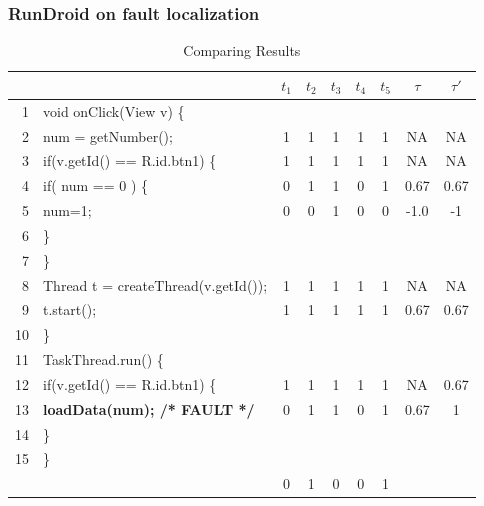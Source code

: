 \documentclass{beamer}
\begin{document}
\begin{frame}
\frametitle{RunDroid on fault localization}
\begin{table}[h]
	\scriptsize	
	\caption{Comparing Results}
	\label{tab:result}
	\begin{tabular}{rl*{5} {|c}|c|c}
		
		&                    & $t_1$ & $t_2$ & $t_3$ & $t_4$ & $t_5$ &  $\tau$ &  $\tau'$ \\
		&void onClick(View v) \{                       &   &   &   &   &   &         \\
		2&\quad num = getNumber();                   & 1 & 1 & 1 & 1 & 1 &  NA  &  NA    \\
		3&\quad if(v.getId() == R.id.btn1) \{           & 1 & 1 & 1 & 1 & 1 &  NA    &  NA \\
		4&\quad \quad if( num == 0 ) \{                    & 0 & 1 & 1 & 0 & 1 & 0.67   & 0.67 \\
		5&\quad \quad \quad num=1;                         & 0 & 0 & 1 & 0 & 0 & -1.0  &-1\\
		6&\quad \quad \}                                   &   &   &   &   &   &             \\
		7&\quad   \}                                       &   &   &   &   &   &            \\
		8&\quad Thread t = createThread(v.getId());          & 1 & 1 & 1 & 1 & 1 & NA&  NA  \\
		9&\quad t.start();                                 & 1 & 1 & 1 & 1 & 1 & 0.67   & 0.67 \\
		10&\}                                              &   &   &   &   &   &             \\
		11&TaskThread.run() \{                             &   &   &   &   &   &       \\
		12&\quad if(v.getId() == R.id.btn1) \{                          & 1 & 1 & 1 & 1 & 1 &  NA   & 0.67 \\
		13&\quad \quad \textbf{loadData(num); /* FAULT */} & 0 & 1 & 1 & 0 & 1 & 0.67    & 1  \\
		14&\quad\}                                         &   &   &   &   &   &            \\
		15&\}                                              &   &   &   &   &   &           \\
		\hline
		&                                                  & 0 & 1 & 0 & 0 & 1 &            \\
	\end{tabular}
\end{table}

\end{frame}
\end{document}
